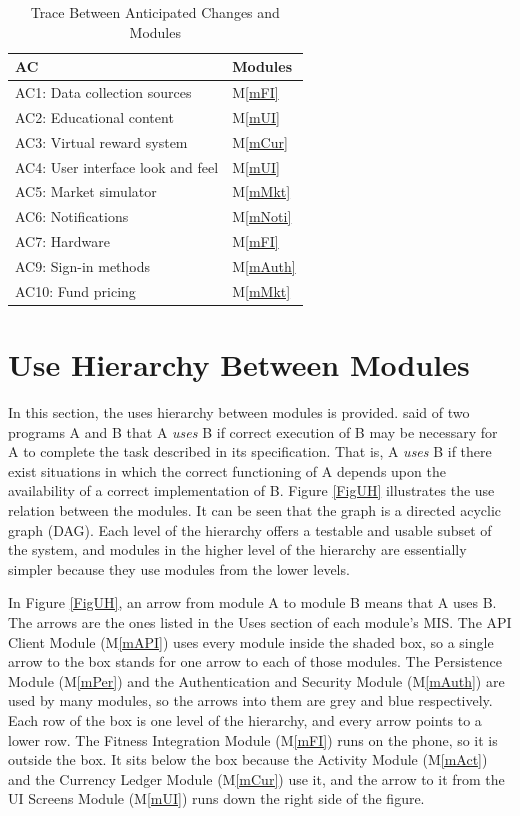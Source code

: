 \documentclass[12pt, titlepage]{article}
\newcommand{\mref}[1]{M\ref{#1}}
\begin{document}
\begin{table}[H]
\centering
\begin{tabular}{p{} p{}}
\toprule
\textbf{AC} & \textbf{Modules}\\
\midrule
AC1: Data collection sources & \mref{mFI}\\
AC2: Educational content & \mref{mUI}\\
AC3: Virtual reward system & \mref{mCur}\\
AC4: User interface look and feel & \mref{mUI}\\
AC5: Market simulator & \mref{mMkt}\\
AC6: Notifications & \mref{mNoti}\\
AC7: Hardware & \mref{mFI}\\
AC9: Sign-in methods & \mref{mAuth}\\
AC10: Fund pricing & \mref{mMkt}\\
\bottomrule
\end{tabular}
\caption{Trace Between Anticipated Changes and Modules}
\label{TblACT}
\end{table}

\section{Use Hierarchy Between Modules} \label{SecUse}

In this section, the uses hierarchy between modules is
provided. \citet{Parnas1978} said of two programs A and B that A {\em uses} B if
correct execution of B may be necessary for A to complete the task described in
its specification. That is, A {\em uses} B if there exist situations in which
the correct functioning of A depends upon the availability of a correct
implementation of B.  Figure \ref{FigUH} illustrates the use relation between
the modules. It can be seen that the graph is a directed acyclic graph
(DAG). Each level of the hierarchy offers a testable and usable subset of the
system, and modules in the higher level of the hierarchy are essentially simpler
because they use modules from the lower levels.

In Figure \ref{FigUH}, an arrow from module A to module B means that A uses B.
The arrows are the ones listed in the Uses section of each module's MIS. The
API Client Module (\mref{mAPI}) uses every module inside the shaded box, so a
single arrow to the box stands for one arrow to each of those modules. The
Persistence Module (\mref{mPer}) and the Authentication and Security Module
(\mref{mAuth}) are used by many modules, so the arrows into them are grey and
blue respectively. Each row of the box is one level of the hierarchy, and
every arrow points to a lower row. The Fitness Integration Module
(\mref{mFI}) runs on the phone, so it is outside the box. It sits below the
box because the Activity Module (\mref{mAct}) and the Currency Ledger Module
(\mref{mCur}) use it, and the arrow to it from the UI Screens Module
(\mref{mUI}) runs down the right side of the figure.
\end{document}
